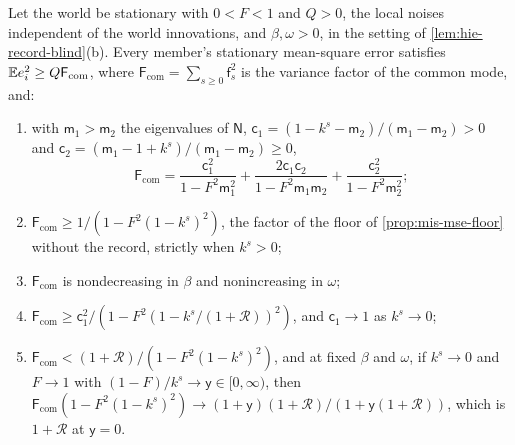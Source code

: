 \begin{theorem}\label{thm:hie-floor}
Let the world be stationary with $0<F<1$ and $Q>0$, the local noises independent of the world innovations, and $\beta,\omega>0$, in the setting of \cref{lem:hie-record-blind}(b). Every member's stationary mean-square error satisfies $\mathbb{E} e_i^2\ge Q\mathsf F_{\mathrm{com}}$, where $\mathsf F_{\mathrm{com}}=\sum_{s\ge0}\mathsf f_s^2$ is the variance factor of the common mode, and:
\begin{enumerate}
\item[(a)] with $\mathsf m_1>\mathsf m_2$ the eigenvalues of $\mathsf N$, $\mathsf c_1=(1-k^s-\mathsf m_2)/(\mathsf m_1-\mathsf m_2)>0$ and $\mathsf c_2=(\mathsf m_1-1+k^s)/(\mathsf m_1-\mathsf m_2)\ge0$,
\begin{equation}\label{eq:hie-floor}
\mathsf F_{\mathrm{com}}=\frac{\mathsf c_1^2}{1-F^2\mathsf m_1^2}+\frac{2\mathsf c_1\mathsf c_2}{1-F^2\mathsf m_1\mathsf m_2}+\frac{\mathsf c_2^2}{1-F^2\mathsf m_2^2};
\end{equation}
\item[(b)] $\mathsf F_{\mathrm{com}}\ge1/(1-F^2(1-k^s)^2)$, the factor of the floor of \cref{prop:mis-mse-floor} without the record, strictly when $k^s>0$;
\item[(c)] $\mathsf F_{\mathrm{com}}$ is nondecreasing in $\beta$ and nonincreasing in $\omega$;
\item[(d)] $\mathsf F_{\mathrm{com}}\ge\mathsf c_1^2/(1-F^2(1-k^s/(1+\mathcal R))^2)$, and $\mathsf c_1\to1$ as $k^s\to0$;
\item[(e)] $\mathsf F_{\mathrm{com}}<(1+\mathcal R)/(1-F^2(1-k^s)^2)$, and at fixed $\beta$ and $\omega$, if $k^s\to0$ and $F\to1$ with $(1-F)/k^s\to\mathsf y\in[0,\infty)$, then $\mathsf F_{\mathrm{com}}(1-F^2(1-k^s)^2)\to(1+\mathsf y)(1+\mathcal R)/(1+\mathsf y(1+\mathcal R))$, which is $1+\mathcal R$ at $\mathsf y=0$.
\end{enumerate}
\end{theorem}

